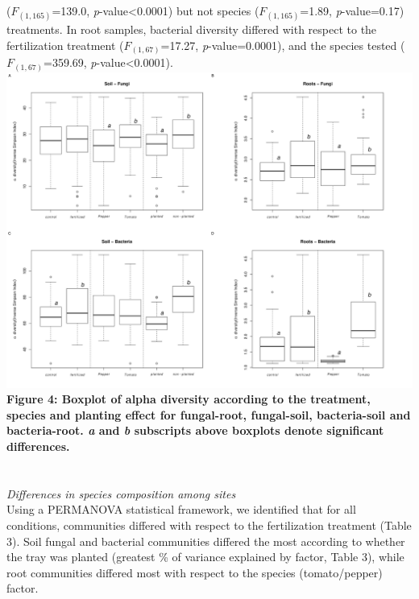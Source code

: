 \documentclass[11pt,]{article}
\begin{document}
(\(F_{(1,165)}\)=139.0, \emph{p}-value\textless{}0.0001) but not species
(\(F_{(1,165)}\)=1.89, \emph{p}-value=0.17) treatments. In root samples,
bacterial diversity differed with respect to the fertilization treatment
(\(F_{(1,67)}\)=17.27, \emph{p}-value=0.0001), and the species tested
(\(F_{(1,67)}\)=359.69, \emph{p}-value\textless{}0.0001). ~\\
\includegraphics[width=6.25000in]{../figures/Figure5_alpha.pdf}\\
\textbf{Figure 4: Boxplot of alpha diversity according to the treatment,
species and planting effect for fungal-root, fungal-soil, bacteria-soil
and bacteria-root. \emph{a} and \emph{b} subscripts above boxplots
denote significant differences.}\\
\hspace*{0.333em}\\
\hspace*{0.333em}\\
\emph{Differences in species composition among sites}\\
Using a PERMANOVA statistical framework, we identified that for all
conditions, communities differed with respect to the fertilization
treatment (Table 3). Soil fungal and bacterial communities differed the
most according to whether the tray was planted (greatest \% of variance
explained by factor, Table 3), while root communities differed most with
respect to the species (tomato/pepper) factor.
\end{document}
